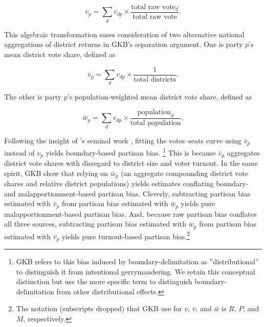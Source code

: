 \documentclass[letter,12pt]{article}
\begin{document}
\begin{equation}
v_p  = \sum_d v_{dp} \times \frac{\text{total raw vote}_d}{\text{total raw vote}}.  %
\end{equation}

\noindent This algebraic transformation eases consideration of two alternative national aggregations of district returns in GKB's separation argument. One is party $p$'s mean district vote share, defined as

\begin{equation}
\bar{v}_p  = \sum_d v_{dp} \times \frac{1}{\text{total districts}}. %
\end{equation}

\noindent The other is party $p$'s population-weighted mean district vote share, defined as

\begin{equation}
\bar{w}_p  = \sum_d v_{dp} \times \frac{\text{population}_d}{\text{total population}}. %
\end{equation}


Following the insight of \citeauthor{tufte1973seatsVotes}'s \citeyearpar{tufte1973seatsVotes} seminal work \citep[further elaborated in][]{gelman.king.1994EvalElSysRedis}, fitting the votes--seats curve using $\bar{v}_p$ instead of $v_p$ yields boundary-based partisan bias. \footnote{GKB refers to this bias induced by boundary-delimitation as ''distributional'' to distinguish it from intentional gerrymandering. We retain this conceptual distinction but use the more specific term to distinguish boundary-delimitation from other distributional effects. } This is because $\bar{v}_p$ aggregates district vote shares with disregard to district size and voter turnout. In the same spirit, GKB show that relying on $\bar{w}_p$ (an aggregate compounding district vote shares and relative district populations) yields estimates conflating boundary- and malapportionment-based partisan bias. Cleverly, subtracting partisan bias estimated with $\bar{v}_p$ from partisan bias estimated with $\bar{w}_p$ yields pure malapportionment-based partisan bias. And, because raw partisan bias conflates all three sources, subtracting partisan bias estimated with $\bar{w}_p$ from partisan bias estimated with $v_p$ yields pure turnout-based partisan bias.\footnote{The notation (subscripts dropped) that GKB use for $v$, $\bar{v}$, and $\bar{w}$ is $R$, $P$, and $M$, respectively.}  
\end{document}
